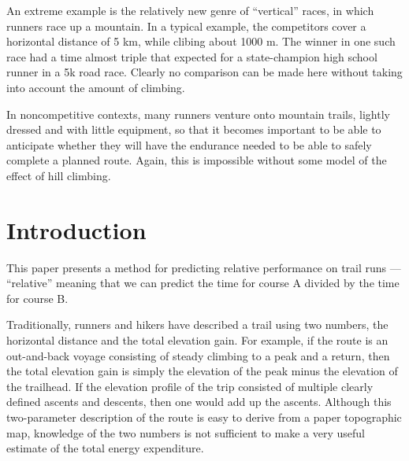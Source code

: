 \documentclass[10pt,letterpaper]{article}
\begin{document}
An extreme example is the relatively new genre
of ``vertical'' races, in which runners race up a mountain.
In a typical example, the competitors cover a horizontal distance of 5 km,
while clibing about 1000 m. The winner in one such race had a time
almost triple that expected for a state-champion high school runner in
a 5k road race. Clearly no comparison can be made here without taking into account
the amount of climbing.

In noncompetitive contexts, many runners venture onto mountain trails,
lightly dressed and with little equipment, so that it becomes important to be able
to anticipate whether they will have the endurance needed to be able to safely complete a planned route.
Again, this is impossible without some model of the effect of hill climbing.



\section{Introduction}

This paper presents a method for predicting relative performance on trail runs --- ``relative''
meaning that we can predict the time for course A divided by the time for course B.

Traditionally, runners and hikers have described a trail using two numbers, the horizontal distance and the total elevation gain.
For example, if the route is an out-and-back voyage consisting of steady climbing to a peak and
a return, then the total elevation gain is simply the elevation of the peak minus the elevation of
the trailhead. If the elevation profile of the trip consisted of multiple clearly defined ascents and descents,
then one would add up the ascents. Although this two-parameter description of the route is
easy to derive from a paper topographic map, knowledge of the two numbers is not sufficient
to make a very useful estimate of the total energy expenditure.
\end{document}
